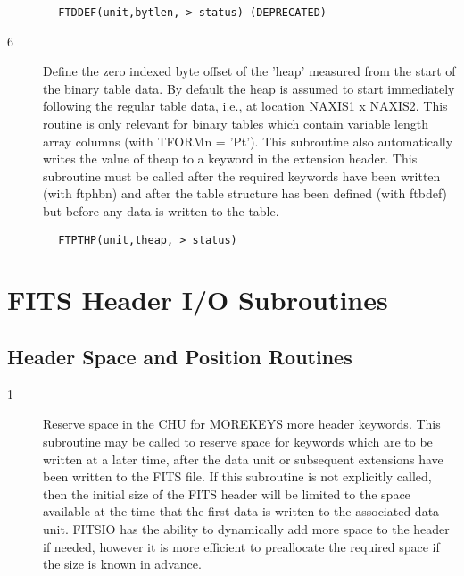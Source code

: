 \documentclass[11pt]{book}
\begin{document}
\begin{verbatim}
        FTDDEF(unit,bytlen, > status) (DEPRECATED)
\end{verbatim}

\begin{description}
\item[6 ] Define the zero indexed byte offset of the 'heap' measured from
    the start of the binary table data.  By default the heap is assumed
    to start immediately following the regular table data, i.e., at
    location NAXIS1 x NAXIS2.  This routine is only relevant for
    binary tables which contain variable length array columns (with
    TFORMn = 'Pt').  This subroutine also automatically writes
    the value of theap to a keyword in the extension header.  This
    subroutine must be called after the required keywords have been
    written (with ftphbn) and after the table structure has been defined
   (with ftbdef) but before any data is written to the table.
\end{description}

\begin{verbatim}
        FTPTHP(unit,theap, > status)
\end{verbatim}


\section{FITS Header I/O Subroutines}


\subsection{Header Space and Position Routines \label{FTHDEF}}


\begin{description}
\item[1 ] Reserve space in the CHU for MOREKEYS more header keywords.
    This subroutine may be called to reserve space for keywords which are
    to be written at a later time, after the data unit or subsequent
    extensions have been written to the FITS file.  If this subroutine is
    not explicitly called, then the initial size of the FITS header will be
    limited to the space available at the time that  the first data is written
    to the associated data unit.   FITSIO has the ability to dynamically
    add more space to the header if needed, however it is more efficient
   to preallocate the required space if the size is known in advance.
\end{description}
\end{document}
